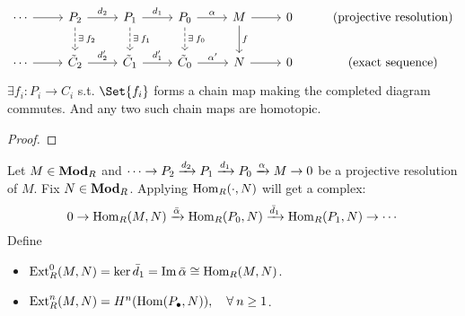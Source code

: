 \begin{theorem}
  \[
    \begin{tikzcd}
      \dotsm \ar[r] & P_2 \ar[r, "d_2"] \ar[d, dashed, "\exists f_2"]
                    & P_1 \ar[r, "d_1"] \ar[d, dashed, "\exists f_1"]
                    & P_0 \ar[r, "\alpha"] \ar[d, dashed, "\exists f_0"]
                    & M \ar[r] \ar[d, "f"] & 0
                    & \text{(projective resolution)} \\
      \dotsm \ar[r] & \tilde C_2 \ar[r, "d_2'"]
                    & \tilde C_1 \ar[r, "d_1'"]
                    & \tilde C_0 \ar[r, "\alpha'"]
                    & N \ar[r] & 0
                    & \text{(exact sequence)}
    \end{tikzcd}
  \]
  $\exists f_i : P_i \to C_i$ s.t. $\Set{f_i}$ forms a chain map making the
  completed diagram commutes. And any two such chain maps are homotopic.
  \begin{proof}
  \end{proof}
\end{theorem}

\begin{definition}
  Let $M \in \mathbf{Mod}_R$ and $\dotsm \to P_2 \xrightarrow{d_2} P_1 \xrightarrow{d_1} P_0 \xrightarrow{\alpha} M \to 0$
  be a projective resolution of $M$. Fix $N \in \mathbf{Mod}_R$. Applying $\operatorname{Hom}_R(\cdot, N)$ will
  get a complex:
  \[
    0 \to \operatorname{Hom}_R(M, N) \xrightarrow{\bar \alpha} \operatorname{Hom}_R(P_0, N) \xrightarrow{\bar d_1}
    \operatorname{Hom}_R(P_1, N) \to \dotsm
  \]
  Define
  \begin{itemize}
    \item $\operatorname{Ext}^0_R(M, N) = \ker \bar d_1 = \operatorname{Im} \bar \alpha \cong \operatorname{Hom}_R(M, N)$.
    \item $\Ext^n_R(M, N) = H^n(\Hom(P_\bullet, N)), \quad \forall n \ge 1$.
  \end{itemize}
\end{definition}

\begin{theorem}
\end{theorem}

\begin{theorem}
\end{theorem}

\begin{theorem}
\end{theorem}


